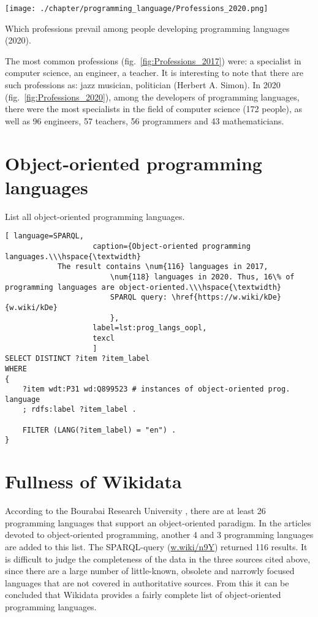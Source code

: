 \begin{marginfigure}
	\texttt{[image: ./chapter/programming\_language/Professions\_2020.png]}
	\caption{Which professions prevail among people developing programming languages (2020).}
	\label{fig:Professions_2020}
\end{marginfigure}

The most common professions (fig.~\ref{fig:Professions_2017}) were: a specialist in computer science, an engineer, a teacher. It is interesting to note that there are such professions as: jazz musician, politician (Herbert A. Simon). In 2020 (fig.~\ref{fig:Professions_2020}), among the developers of programming languages, there were the most specialists in the field of computer science (172 people), as well as 96 engineers, 57 teachers, 56 programmers and 43 mathematicians.

\section{Object-oriented programming languages}

List all object-oriented programming languages.

\begin{lstlisting}[ language=SPARQL, 
                    caption={Object-oriented programming languages.\\\hspace{\textwidth}
			The result contains \num{116} languages in 2017, 
                        \num{118} languages in 2020. Thus, 16\% of programming languages are object-oriented.\\\hspace{\textwidth}
                        SPARQL query: \href{https://w.wiki/kDe}{w.wiki/kDe}
                        },
                    label=lst:prog_langs_oopl,
                    texcl 
                    ]
SELECT DISTINCT ?item ?item_label
WHERE
{
    ?item wdt:P31 wd:Q899523 # instances of object-oriented prog. language
    ; rdfs:label ?item_label . 

    FILTER (LANG(?item_label) = "en") . 
}
\end{lstlisting}%

\section{Fullness of Wikidata}

According to the Bourabai Research University \cite{obj_orient_langs_bourabai}, there are at least 26 programming languages that support an object-oriented paradigm. In the articles devoted to object-oriented programming, another 4 \cite{oo_langs_science_wikia} and 3 \cite{oo_langs_garshin} programming languages are added to this list. The SPARQL-query (\href{https://w.wiki/n9Y}{w.wiki/n9Y}) returned 116 results. It is difficult to judge the completeness of the data in the three sources cited above, since there are a large number of little-known, obsolete and narrowly focused languages that are not covered in authoritative sources. From this it can be concluded that Wikidata provides a fairly complete list of object-oriented programming languages.

